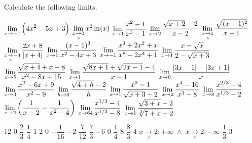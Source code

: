 \begin{Exercise} Calculate the following limits. 
 \begin{multicols}{2} 
        \ifcalculus
        \Question[difficulty = 1] $\displaystyle\lim_{x\rightarrow -1} \left(4x^2-5x+3\right)$
        \Question[difficulty = 1] $\displaystyle\lim_{x\underset{>}{\rightarrow}0} x^2\ln(x)$
        \Question[difficulty = 1] $\displaystyle\lim_{x\rightarrow 1} \dfrac{x^2-1}{x^3-1} $
        \Question[difficulty = 1] $\displaystyle\lim_{x\rightarrow 2} \dfrac{\sqrt{x+2}-2}{x-2}$
        \fi
		\Question[difficulty = 1] $\displaystyle\lim_{x\underset{>}{\rightarrow}1} \dfrac{\sqrt{(x-1)^2}}{x-1}$
		\Question[difficulty = 1] $\displaystyle\lim_{x\underset{>}{\rightarrow}-4}\dfrac{2x+8}{|x+4|}$
		\Question[difficulty = 1] $\displaystyle\lim_{x\rightarrow 1}\dfrac{(x-1)^3}{x^2-4x+3}$
		\Question[difficulty = 1] $\displaystyle\lim_{x\rightarrow -1}\dfrac{x^3+2x^2+x}{x^8-2x^4+1}$
		\ifanalysis\Question[difficulty = 1]\fi\ifcalculus\Question[difficulty = 2]\fi $\displaystyle\lim_{x\rightarrow 1}\dfrac{x-\sqrt{x}}{2-\sqrt{x+3}}$
		\ifanalysis\Question[difficulty = 1]\fi\ifcalculus\Question[difficulty = 2]\fi $\displaystyle\lim_{x\rightarrow 5}\dfrac{\sqrt{x+4}+x-8}{x^2-8x+15}$
		\Question[difficulty = 3] $\displaystyle\lim_{x\rightarrow 1}\dfrac{\sqrt{8x+1}+\sqrt{2x-1}-4}{x-1}$
		\Question[difficulty = 1] $\displaystyle\lim_{x\rightarrow 0} \dfrac{|3x-1| - |3x+1|}{x}$
		\Question[difficulty = 1] $\displaystyle\lim_{x\rightarrow 3} \dfrac{x^2-6x+9}{x^2-9}$
		\Question[difficulty = 1] $\displaystyle\lim_{h\rightarrow 0} \dfrac{\sqrt{4+h}-2}{h}$ 
    	\Question[difficulty = 1] $\displaystyle\lim_{x\rightarrow 1} \dfrac{x^2-1}{\sqrt{x+3}-2}$
        \Question[difficulty = 1] $\displaystyle\lim_{x\rightarrow 2} \dfrac{x^4-16}{x^3-8}$
        \ifanalysis
        	\Question[difficulty = 1] $\displaystyle\lim_{x\rightarrow 8} \dfrac{x^{2/3}-4}{x^{1/3}-2}$ 
        	\Question[difficulty = 1] $\displaystyle\lim_{x\rightarrow 2} \left(\dfrac{1}{x-2} - \dfrac{1}{x^2-4} \right)$
            \Question[difficulty = 2] $\displaystyle\lim_{x\rightarrow 64} \dfrac{x^{1/3}-4}{x^{1/2}-8}$
            \Question[difficulty = 2] $\displaystyle\lim_{x\rightarrow 1} \dfrac{\sqrt{3+x} - 2}{\sqrt[3]{7+x} - 2}$
        \fi
        \EndCurrentQuestion
\end{multicols}

\end{Exercise}

\begin{Answer}\phantom{}
    \begin{multicols}{3} 
		
		    \ifcalculus
		    \Question $12$
		    \Question $0$
		    \Question $\dfrac{2}{3}$
		    \Question $\dfrac{1}{4}$
		    \fi
			\Question $1$
			\Question $2$
			\Question $0$
			\Question $-\dfrac{1}{16}$
			\Question $-2$ 
			\Question $\dfrac{7}{12}$
			\Question $\dfrac{7}{3}$
			\Question $-6$ 
		    \Question $0$ 
            \Question $\dfrac{1}{4}$ 
            \Question $8$ 
    	   	\Question $\dfrac{8}{3}$ 
         \ifanalysis
            \Question $4$ 
            \Question $x\underset{>}{\rightarrow}2: +\infty \; \wedge\; x\underset{<}{\rightarrow}2: - \infty$ 
            \Question $\dfrac{1}{3}$ 
            \Question $3$
         \fi
		\EndCurrentQuestion	
	\end{multicols}
\end{Answer}


